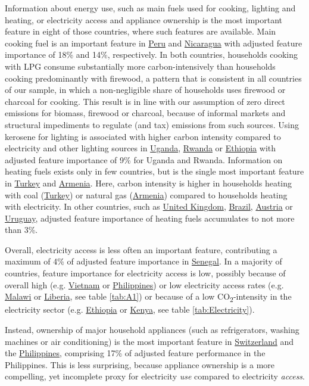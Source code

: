 \documentclass[12pt, a4paper]{article}
\begin{document}
Information about energy use, such as main fuels used for cooking, lighting and heating, or electricity access and appliance ownership is the most important feature in eight of those countries, where such features are available. Main cooking fuel is an important feature in \hyperref[fig:5b_PER]{Peru} and \hyperref[fig:5b_NIC]{Nicaragua} with adjusted feature importance of 18\% and 14\%, respectively. In both countries, households cooking with LPG consume substantially more carbon-intensively than households cooking predominantly with firewood, a pattern that is consistent in all countries of our sample, in which a non-negligible share of households uses firewood or charcoal for cooking. This result is in line with our assumption of zero direct emissions for biomass, firewood or charcoal, because of informal markets and structural impediments to regulate (and tax) emissions from such sources. Using kerosene for lighting is associated with higher carbon intensity compared to electricity and other lighting sources in \hyperref[fig:5b_UGA]{Uganda}, \hyperref[fig:5b_RWA]{Rwanda} or \hyperref[fig:5b_ETH]{Ethiopia} with adjusted feature importance of 9\% for Uganda and Rwanda. Information on heating fuels exists only in few countries, but is the single most important feature in \hyperref[fig:5b_TUR]{Turkey} and \hyperref[fig:5b_ARM]{Armenia}. Here, carbon intensity is higher in households heating with coal (\hyperref[fig:5b_TUR]{Turkey}) or natural gas (\hyperref[fig:5b_ARM]{Armenia}) compared to households heating with electricity. In other countries, such as \hyperref[fig:5b_GBR]{United Kingdom}, \hyperref[fig:5b_BRA]{Brazil}, \hyperref[fig:5b_AUT]{Austria} or \hyperref[fig:5b_URY]{Uruguay}, adjusted feature importance of heating fuels accumulates to not more than 3\%.

Overall, electricity access is less often an important feature, contributing a maximum of 4\% of adjusted feature importance in \hyperref[fig:5b_SEN]{Senegal}. In a majority of countries, feature importance for electricity access is low, possibly because of overall high (e.g. \hyperref[fig:5b_VNM]{Vietnam} or \hyperref[fig:5b_PHL]{Philippines}) or low electricity access rates (e.g. \hyperref[fig:5b_MWI]{Malawi} or \hyperref[fig:5b_LBR]{Liberia}, see table \ref{tab:A1}) or because of a low CO\textsubscript{2}-intensity in the electricity sector (e.g. \hyperref[fig:5b_ETH]{Ethiopia} or \hyperref[fig:5b_KEN]{Kenya}, see table \ref{tab:Electricity}).

Instead, ownership of major household appliances (such as refrigerators, washing machines or air conditioning) is the most important feature in \hyperref[fig:5b_CHE]{Switzerland} and the \hyperref[fig:5b_PHL]{Philippines}, comprising 17\% of adjusted feature performance in the Philippines. This is less surprising, because appliance ownership is a more compelling, yet incomplete proxy for electricity \textit{use} compared to electricity \textit{access}.
\end{document}

